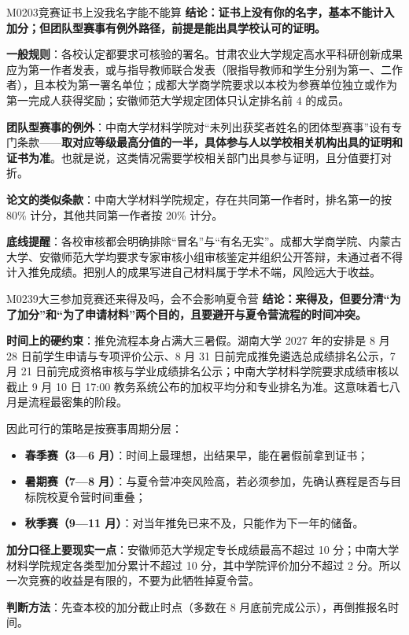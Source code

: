 \begin{qa}{M0203}{竞赛证书上没我名字能不能算}
\textbf{结论：证书上没有你的名字，基本不能计入加分；但团队型赛事有例外路径，前提是能出具学校认可的证明。}

\textbf{一般规则}：各校认定都要求可核验的署名。甘肃农业大学规定高水平科研创新成果应为第一作者发表，或与指导教师联合发表（限指导教师和学生分别为第一、二作者），且本校为第一署名单位；成都大学商学院要求以本校为参赛单位独立或作为第一完成人获得奖励；安徽师范大学规定团体只认定排名前 4 的成员。

\textbf{团队型赛事的例外}：中南大学材料学院对“未列出获奖者姓名的团体型赛事”设有专门条款——\textbf{取对应等级最高分值的一半，具体参与人以学校相关机构出具的证明和证书为准}。也就是说，这类情况需要学校相关部门出具参与证明，且分值要打对折。

\textbf{论文的类似条款}：中南大学材料学院规定，存在共同第一作者时，排名第一的按 80\% 计分，其他共同第一作者按 20\% 计分。

\textbf{底线提醒}：各校审核都会明确排除“冒名”与“有名无实”。成都大学商学院、内蒙古大学、安徽师范大学均要求专家审核小组审核鉴定并组织公开答辩，未通过者不得计入推免成绩。把别人的成果写进自己材料属于学术不端，风险远大于收益。
\end{qa}

\begin{qa}{M0239}{大三参加竞赛还来得及吗，会不会影响夏令营}
\textbf{结论：来得及，但要分清“为了加分”和“为了申请材料”两个目的，且要避开与夏令营流程的时间冲突。}

\textbf{时间上的硬约束}：推免流程本身占满大三暑假。湖南大学 2027 年的安排是 8 月 28 日前学生申请与专项评价公示、8 月 31 日前完成推免遴选总成绩排名公示，7 月 21 日前完成资格审核与学业成绩排名公示；中南大学材料学院要求成绩审核以截止 9 月 10 日 17:00 教务系统公布的加权平均分和专业排名为准。这意味着七八月是流程最密集的阶段。

因此可行的策略是按赛事周期分层：
\begin{itemize}
  \item \textbf{春季赛（3—6 月）}：时间上最理想，出结果早，能在暑假前拿到证书；
  \item \textbf{暑期赛（7—8 月）}：与夏令营冲突风险高，若必须参加，先确认赛程是否与目标院校夏令营时间重叠；
  \item \textbf{秋季赛（9—11 月）}：对当年推免已来不及，只能作为下一年的储备。
\end{itemize}

\textbf{加分口径上要现实一点}：安徽师范大学规定专长成绩最高不超过 10 分；中南大学材料学院规定各类型加分累计不超过 10 分，其中学院评价加分不超过 2 分。所以一次竞赛的收益是有限的，不要为此牺牲掉夏令营。

\textbf{判断方法}：先查本校的加分截止时点（多数在 8 月底前完成公示），再倒推报名时间。
\end{qa}

